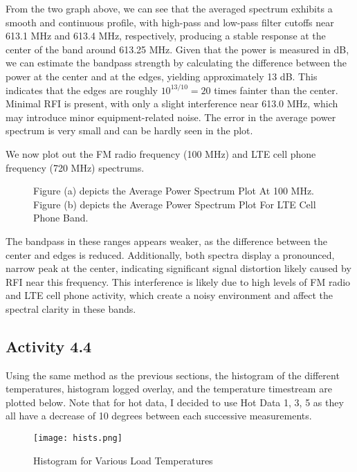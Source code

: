 \documentclass[10pt, preprint]{aastex}
\begin{document}
From the two graph above, we can see that the averaged spectrum exhibits a smooth and continuous profile, with high-pass and low-pass filter cutoffs near 613.1 MHz and 613.4 MHz, respectively, producing a stable response at the center of the band around 613.25 MHz. Given that the power is measured in dB, we can estimate the bandpass strength by calculating the difference between the power at the center and at the edges, yielding approximately 13 dB. This indicates that the edges are roughly $10^{13/10} = 20$ times fainter than the center. Minimal RFI is present, with only a slight interference near 613.0 MHz, which may introduce minor equipment-related noise. The error in the average power spectrum is very small and can be hardly seen in the plot. 

We now plot out the FM radio frequency (100 MHz) and LTE cell phone frequency (720 MHz) spectrums.

\begin{figure}[H]
  \centering
  \hfill
  \caption{\label{fig:spectrums2} Figure (a) depicts the Average Power Spectrum Plot At 100 MHz. Figure (b) depicts the Average Power Spectrum Plot For LTE Cell Phone Band. }
\end{figure}

The bandpass in these ranges appears weaker, as the difference between the center and edges is reduced. Additionally, both spectra display a pronounced, narrow peak at the center, indicating significant signal distortion likely caused by RFI near this frequency. This interference is likely due to high levels of FM radio and LTE cell phone activity, which create a noisy environment and affect the spectral clarity in these bands.

\subsection{Activity 4.4}
Using the same method as the previous sections, the histogram of the different temperatures, histogram logged overlay, and the temperature timestream are plotted below. Note that for hot data, I decided to use Hot Data 1, 3, 5 as they all have a decrease of 10 degrees between each successive measurements. 

\begin{figure}[H]
\centering
\texttt{[image: hists.png]}
\caption{\label{fig:hists}Histogram for Various Load Temperatures}
\end{figure}
\end{document}
